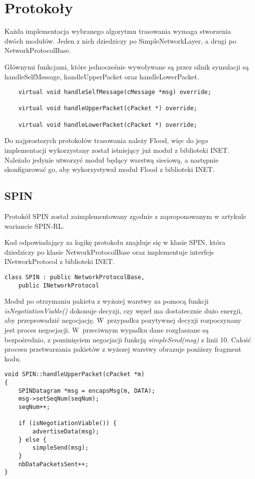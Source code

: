 \section{Protokoły}\label{sec:protocols}
Każda implementacja wybranego algorytmu trasowania wymaga stworzenia dwóch modułów. Jeden z nich dziedziczy po SimpleNetworkLayer, a drugi po NetworkProtocolBase.

Głównymi funkcjami, które jednocześnie wywoływane są przez silnik symulacji są handleSelfMessage, handleUpperPacket oraz handleLowerPacket.

\begin{verbatim}
    virtual void handleSelfMessage(cMessage *msg) override;

    virtual void handleUpperPacket(cPacket *) override;

    virtual void handleLowerPacket(cPacket *) override;
\end{verbatim}

Do najprostszych protokołów trasowania należy Flood, więc do jego implementacji wykorzystany został istniejący już moduł z biblioteki INET. Należało jedynie utworzyć  moduł będący warstwą sieciową, a następnie skonfigurować go, aby wykorzystywał moduł Flood z biblioteki INET.
\subsection{SPIN}
Protokół SPIN został zaimplementowany zgodnie z zaproponowanym w artykule \cite{Kulik2002} wariancie SPIN-RL.

Kod odpowiadający za logikę protokołu znajduje się w klasie SPIN, która dziedziczy po klasie NetworkProtocolBase oraz implementuje interfejs INetworkProtocol z biblioteki INET.

\begin{verbatim}
class SPIN : public NetworkProtocolBase,
    public INetworkProtocol
\end{verbatim}

Moduł po otrzymaniu pakietu z wyższej warstwy za pomocą funkcji \textit{isNegotiationViable()} dokonuje decyzji, czy węzeł ma dostatecznie dużo energii, aby przeprowadzić negocjację. W~przypadku pozytywnej decyzji rozpoczynany jest proces negocjacji. W~przeciwnym wypadku dane rozgłaszane są bezpośrednio, z pominięciem negocjacji funkcją \textit{simpleSend(msg)} z linii 10. Całość procesu przetwarzania pakietów z wyższej warstwy obrazuje poniższy fragment kodu.

\begin{verbatim}
void SPIN::handleUpperPacket(cPacket *m)
{
    SPINDatagram *msg = encapsMsg(m, DATA);
    msg->setSeqNum(seqNum);
    seqNum++;

    if (isNegotiationViable()) {
        advertiseData(msg);
    } else {
        simpleSend(msg);
    }
    nbDataPacketsSent++;
}
\end{verbatim}


